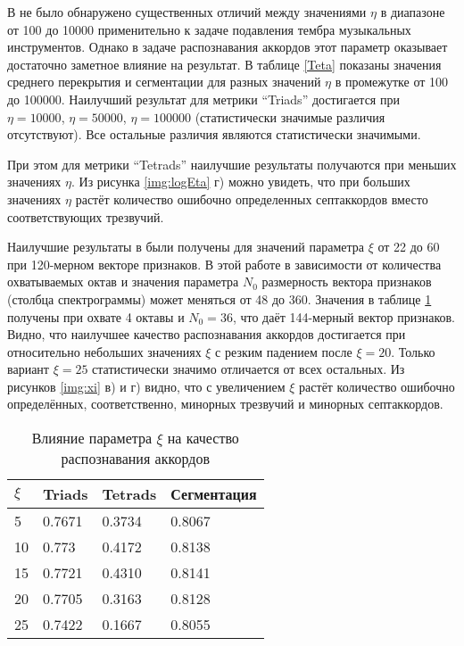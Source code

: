 В \cite{Mueller2009} не было обнаружено существенных отличий между значениями
$\eta$ в диапазоне от 100 до 10000 применительно к задаче подавления тембра
музыкальных инструментов. Однако в задаче распознавания аккордов этот параметр
оказывает достаточно заметное влияние на результат. В таблице \ref{Teta}
показаны значения среднего перекрытия и сегментации для разных значений $\eta$
в промежутке от 100 до 100000. Наилучший результат для метрики ``Triads''
достигается при $\eta=10000$, $\eta=50000$, $\eta=100000$ (статистически
значимые различия отсутствуют). Все остальные различия являются статистически
значимыми.

При этом для метрики ``Tetrads'' наилучшие результаты получаются при меньших
значениях $\eta$. Из рисунка \ref{img:logEta} г) можно увидеть, что при больших
значениях $\eta$ растёт количество ошибочно определенных септаккордов вместо
соответствующих трезвучий.

Наилучшие результаты в \cite{Mueller2009} были получены для значений параметра
$\xi$ от 22 до 60 при 120-мерном векторе признаков. В этой работе в зависимости
от количества охватываемых октав и значения параметра $N_0$ размерность вектора
признаков (столбца спектрограммы) может меняться от 48 до 360. Значения в
таблице \ref{Txi} получены при охвате 4 октавы и $N_0=36$, что даёт 144-мерный
вектор признаков. Видно, что наилучшее качество распознавания аккордов
достигается при относительно небольших значениях $\xi$ с резким падением после
$\xi=20$. Только вариант $\xi=25$ статистически значимо отличается от всех
остальных. Из рисунков \ref{img:xi} в) и г) видно, что с увеличением $\xi$
растёт количество ошибочно определённых, соответственно, минорных трезвучий и
минорных септаккордов.

\begin{table} [htbp]
  \centering
  \parbox{15cm}{\caption{Влияние параметра $\xi$ на качество распознавания
  аккордов} \label{Txi}}
  \begin{tabular}{|l|l|l|l|}
  \hline
  $\xi$ & Triads & Tetrads & Сегментация \\
  \hline
  5 & 0.7671 & 0.3734 & 0.8067 \\
  10 & 0.773 & 0.4172 & 0.8138 \\
  15 & 0.7721 & 0.4310 & 0.8141 \\
  20 & 0.7705 & 0.3163 & 0.8128 \\
  25 & 0.7422 & 0.1667 & 0.8055 \\
  \hline
  \end{tabular}
\end{table}

